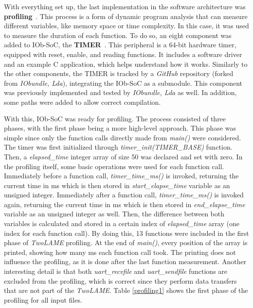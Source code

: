 With everything set up, the last implementation in the software architecture was \textbf{profiling}~\cite{profiling}. This process is a form of dynamic program analysis that can measure different variables, like memory space or time complexity. In this case, it was used to measure the duration of each function.
To do so, an eight component was added to IOb-SoC, the \textbf{TIMER}~\cite{bib:iobtimer}. This peripheral is a 64-bit hardware timer, equipped with reset, enable, and reading functions. It includes a software driver and an example C application, which helps understand how it works. 
Similarly to the other components, the TIMER is tracked by a \textit{GitHub} repository (forked from \textit{IObundle, Lda}), integrating the IOb-SoC as a submodule. This component was previously implemented and tested by \textit{IObundle, Lda} as well. In addition, some paths were added to allow correct compilation.

With this, IOb-SoC was ready for profiling. The process consisted of three phases, with the first phase being a more high-level approach. 
This phase was simple since only the function calls directly made from \textit{main()} were considered. The timer was first initialized through \textit{timer\_init(TIMER\_BASE)} function. Then, a \textit{elapsed\_time} integer array of size 50 was declared and set with zero. In the profiling itself, some basic operations were used for each function call. Immediately before a function call, \textit{timer\_time\_ms()} is invoked, returning the current time in ms which is then stored in \textit{start\_elapse\_time} variable as an unsigned integer. Immediately after a function call, \textit{timer\_time\_ms()} is invoked again, returning the current time in ms which is then stored in \textit{end\_elapse\_time} variable as an unsigned integer as well. Then, the difference between both variables is calculated and stored in a certain index of \textit{elapsed\_time} array (one index for each function call). 
By doing this, 13 functions were included in the first phase of \textit{TwoLAME} profiling. At the end of \textit{main()}, every position of the array is printed, showing how many ms each function call took. The printing does not influence the profiling, as it is done after the last function measurement. Another interesting detail is that both \textit{uart\_recvfile} and \textit{uart\_sendfile} functions are excluded from the profiling, which is correct since they perform data transfers that are not part of the \textit{TwoLAME}.
Table \ref{profiling1} shows the first phase of the profiling for all input files.

